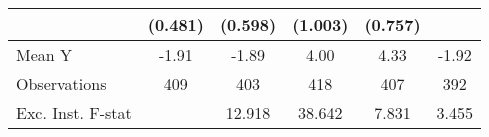 {\begin{tabular}{l*{5}{c}}
            &     (0.481)         &     (0.598)         &     (1.003)         &     (0.757)         &                     \\
\midrule
Mean Y      &       -1.91         &       -1.89         &        4.00         &        4.33         &       -1.92         \\
Observations&         409         &         403         &         418         &         407         &         392         \\
Exc. Inst. F-stat&                     &      12.918         &      38.642         &       7.831         &       3.455         \\
\bottomrule
\end{tabular}
}
